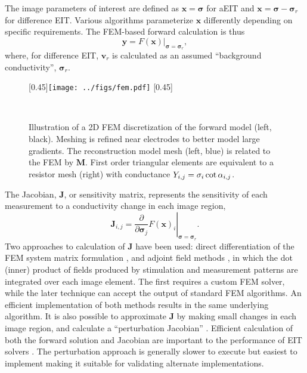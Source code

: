 \documentclass[12pt]{article} \usepackage[margin=3cm]{geometry} \usepackage[margin=20pt,font=small,labelfont=bf]{caption}\def\TBLWIDA{35mm}\def\TBLWIDB{95mm}
\newcommand{\xB}{\mathbf{x}}
\newcommand{\yB}{\mathbf{y}}
\newcommand{\vB}{\mathbf{v}}
\newcommand{\MB}{\mathbf{M}}
\newcommand{\JB}{\mathbf{J}}
\newcommand{\sG}{\bm{\sigma}}
\begin{document}
The image parameters of interest are defined as $\xB = \sG$ for aEIT and
$\xB = \sG - \sG_r$ for difference EIT. Various algorithms parameterize
$\xB$ differently depending on specific requirements.
The FEM-based forward calculation is thus
\begin{equation}
\yB = \left. F(\xB) \right|_{\sG = \sG_r},
\end{equation}
where, for difference EIT, $\vB_r$ is calculated as an assumed
``background conductivity'', $\sG_r$.

\begin{figure} \centering
   [0.45\columnwidth]{\texttt{[image: ../figs/fem.pdf]}}\hfil
   [0.45\columnwidth]{
   }\\
\caption{%
Illustration of a 2D FEM discretization of the forward model (left, black).
Meshing is refined near electrodes to better model large gradients.
The reconstruction model mesh (left, blue) is related to the FEM by 
$\MB$. 
   First order triangular elements are equivalent to a resistor mesh (right)
with conductance $Y_{i,j} = \sigma_i \mathop{\rm cot} \alpha_{i,j}$.
}
\label{fig:FEM_mapping}
\end{figure}

The Jacobian, $\JB$, or sensitivity matrix, represents
the sensitivity of each measurement to a conductivity 
change in each image region,
\begin{equation}
\JB_{i,j} = \left. 
 \frac{\partial}
           {\partial \sG_j} F( \xB )_i 
\right|_{\sG = \sG_r}.
\end{equation}
Two approaches to calculation of $\JB$ have been used:
direct differentiation of the FEM system matrix
formulation \cite{Yorkey1987Comparing}, and
adjoint field methods \cite{Polydorides2002EIDORS},
 in which the dot (inner) product of
fields produced by stimulation and measurement patterns
are integrated over each image element.
The first requires a custom FEM solver, while the
later technique can accept the output of standard FEM algorithms.
An efficient implementation of both methods results
in the same underlying algorithm\cite{Adler2017Jacobian}.
It is also possible to approximate $\JB$ 
by making small changes in each image region, and calculate a ``perturbation
Jacobian'' \cite{Yorkey1987Comparing}.
Efficient calculation of both the forward solution and
Jacobian are important to the performance of EIT solvers \cite{Boyle2012Compute}.
The perturbation approach is generally slower to execute but easiest to
implement making it suitable for validating alternate implementations.
\end{document}
